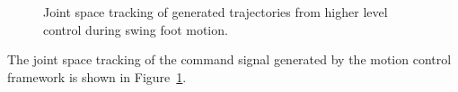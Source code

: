 \begin{figure}[!t]
	\begin{center}
	\end{center}
  	\caption{Joint space tracking of generated trajectories from higher level control during swing foot motion.}
	\label{fig:swingfootq}
\end{figure} 

The joint space tracking of the command signal generated by the motion control framework is shown in Figure~\ref{fig:swingfootq}.

